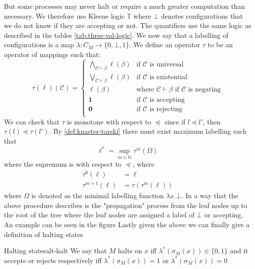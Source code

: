 But some processes may never halt or require a much greater computation than necessary.
We therefore use Kleene logic $\mathbb{T}$ where $\bot$ denotes configurations
that we do not know if they are accepting or not. The quantifiers
use the same logic as described in the tables \ref{tab:three-val-logic}.
We now say that a labelling of configurations is a map $\lambda: C_M \to \{0, \bot ,1\}$.
We define an operator $\tau$ to be an operator of mappings such that:
$$
    \tau(\ell)(\mathcal{C}) = \begin{cases}
        \bigwedge_{\mathcal{C} \vdash \beta} \ell(\beta) & \text{if }\mathcal{C} \text{ is universal}                                        \\
        \bigvee_{\mathcal{C} \vdash \beta} \ell(\beta)   & \text{if }\mathcal{C} \text{ is existential}                                      \\
        \ell(\beta)                                      & \text{where }\mathcal{C} \vdash \beta \text{ if } \mathcal{C} \text{ is negating} \\
        \mathbf{1}                                       & \text{if } \mathcal{C} \text{ is accepting}                                       \\
        \mathbf{0}                                       & \text{if } \mathcal{C} \text{ is rejecting}                                       \\
    \end{cases}
$$
We can check that $\tau$ is monotone with respect to $\preceq$ since
if $l \preceq l'$, then $\tau(l) \preceq \tau(l')$. By
\ref{def:knaster-tarski} there must exist maximum labelling such that
$$
    \ell^* = \sup_{m \in \mathbb{N}} \tau^m(\Omega)
$$
where the supremum is with respect to $\preceq$, where
\begin{align*}
    \tau^0(\ell)      & = \ell               \\
    \tau^{m +1}(\ell) & = \tau(\tau^m(\ell))
\end{align*}
where $\Omega$ is denoted as the minimal labelling function $\lambda x. \bot$.
In a way that the above procedure describes is the "propagation" process from the leaf nodes up to the root of the tree
where the leaf nodes are assigned a label of $\bot$ or accepting. An example can be seen in the figure {}
Lastly given the above we can finally give a definition of halting states

\begin{definitionbox}{Halting states\cite{chandra1981alternation}}{alt-halt}
    \label{def:alt-halt}
    We say that $M$ halts on $x$ iff $\lambda^*(\sigma_M(x)) \in \{0,1\}$ and
    it accepts or rejects respectively iff  $\lambda^*(\sigma_M(x)) = 1$ or $\lambda^*(\sigma_M(x)) = 0$
\end{definitionbox}

